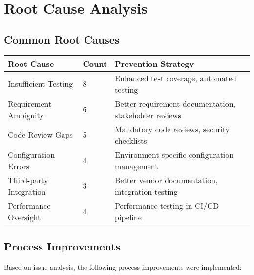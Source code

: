 \documentclass[12pt,a4paper]{article}
\begin{document}
\section{Root Cause Analysis}

\subsection{Common Root Causes}

\begin{longtable}{|p{3.5cm}|p{1.5cm}|p{7.5cm}|}
\hline
\textbf{Root Cause} & \textbf{Count} & \textbf{Prevention Strategy} \\
\hline
Insufficient Testing & 8 & Enhanced test coverage, automated testing \\
\hline
Requirement Ambiguity & 6 & Better requirement documentation, stakeholder reviews \\
\hline
Code Review Gaps & 5 & Mandatory code reviews, security checklists \\
\hline
Configuration Errors & 4 & Environment-specific configuration management \\
\hline
Third-party Integration & 3 & Better vendor documentation, integration testing \\
\hline
Performance Oversight & 4 & Performance testing in CI/CD pipeline \\
\hline
\end{longtable}

\subsection{Process Improvements}

Based on issue analysis, the following process improvements were implemented:
\end{document}
